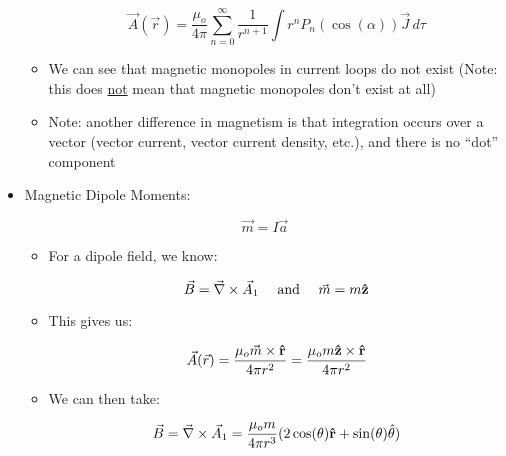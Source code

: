 \begin{itemize}
\begin{itemize}
        $$\vec{A}(\vec{r})=\frac{\mu_o}{4\pi}\sum_{n=0}^\infty \frac{1}{r^{n+1}}\int r^nP_n(\cos(\alpha))\vec{J}\,d\tau$$

      \item We can see that magnetic monopoles in current loops do not exist (Note: this does \underline{not} mean that magnetic monopoles don't exist at all)

      \item Note: another difference in magnetism is that integration occurs over a vector (vector current, vector current density, etc.), and there is no ``dot'' component

    \end{itemize}

  \item Magnetic Dipole Moments:

    $$\vec{m}=I\vec{a}$$

    \begin{itemize}

      \item For a dipole field, we know:

        $$\vec{B}=\vec{\nabla}\times\vec{A}_1\quad\text{ and }\quad\vec{m}=m\bold{\hat{z}}$$

      \item This gives us:

        $$\vec{A}(\vec{r})=\frac{\mu_o\vec{m}\times\bold{\hat{r}}}{4\pi r^2}=\frac{\mu_om\bold{\hat{z}}\times\bold{\hat{r}}}{4\pi r^2}$$

      \item We can then take:

        $$\vec{B}=\vec{\nabla}\times\vec{A}_1=\frac{\mu_om}{4\pi r^3}(2\cos(\theta)\bold{\hat{r}}+\sin(\theta)\hat{\theta})$$

    \end{itemize}

\end{itemize}



